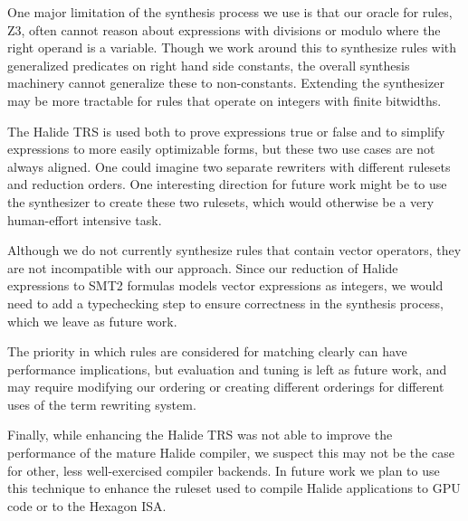 \documentclass[acmsmall,review]{acmart}\settopmatter{printfolios=true,printccs=false,printacmref=false}
\begin{document}
One major limitation of the synthesis process we use is that our oracle
for rules, Z3, often cannot reason about expressions with divisions or modulo
where the right operand is a variable.  Though we work around this to
synthesize rules with generalized predicates on right hand side constants,
the overall synthesis machinery cannot generalize these to non-constants.
Extending the synthesizer may be more tractable for rules that operate
on integers with finite bitwidths.

The Halide TRS is used both to prove expressions true or false and to
simplify expressions to more easily optimizable forms, but these two use cases
are not always aligned. One could imagine two separate rewriters with
different rulesets and reduction orders. One interesting direction for future
work might be to use the synthesizer to create these two rulesets, which would
otherwise be a very human-effort intensive task.

Although we do not currently synthesize rules that contain vector operators,
they are not incompatible with our approach. Since our reduction of Halide
expressions to SMT2 formulas models vector expressions as integers, we would need
to add a typechecking step to ensure correctness in the synthesis process, which
we leave as future work.

The priority in which rules are considered for matching clearly can have
performance implications, but evaluation and tuning is left as future work, and
may require modifying our ordering or creating different orderings for different
uses of the term rewriting system.

Finally, while enhancing the Halide TRS was not able to improve the performance of the mature Halide compiler, we suspect this may not be the case for other, less well-exercised compiler backends. In future work we plan to use this technique to enhance the ruleset used to compile Halide applications to GPU code or to the Hexagon ISA.
\end{document}
